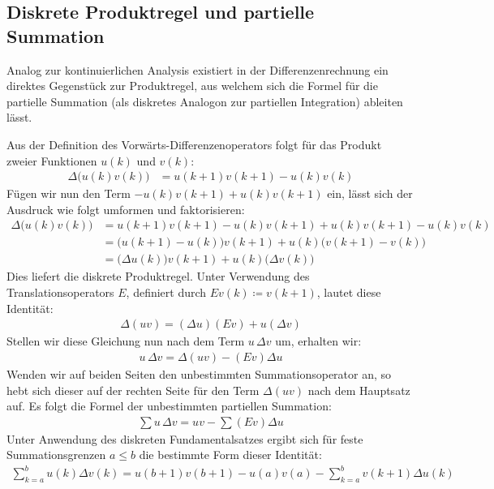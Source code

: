 \documentclass{article}
\theoremstyle{definition}
\begin{document}
\subsection{Diskrete Produktregel und partielle Summation}
Analog zur kontinuierlichen Analysis existiert in der Differenzenrechnung ein direktes Gegenstück zur Produktregel, aus welchem sich die Formel für die partielle Summation (als diskretes Analogon zur partiellen Integration) ableiten lässt.

Aus der Definition des Vorwärts-Differenzenoperators folgt für das Produkt zweier Funktionen $u(k)$ und $v(k)$:
\begin{align*}
    \Delta \big(u(k)v(k)\big) &= u(k + 1)v(k + 1) - u(k)v(k)
\end{align*}
Fügen wir nun den Term $-u(k)v(k + 1) + u(k)v(k + 1)$ ein, lässt sich der Ausdruck wie folgt umformen und faktorisieren:
\begin{align*}
    \Delta \big(u(k)v(k)\big) &= u(k + 1)v(k + 1) - u(k)v(k + 1) + u(k)v(k + 1) - u(k)v(k) \\
    &= \big(u(k + 1) - u(k)\big)v(k + 1) + u(k)\big(v(k + 1) - v(k)\big) \\
    &= \big(\Delta u(k)\big)v(k + 1) + u(k)\big(\Delta v(k)\big)
\end{align*}
Dies liefert die diskrete Produktregel. Unter Verwendung des Translationsoperators $E$, definiert durch $Ev(k) \coloneqq v(k+1)$, lautet diese Identität:
\begin{align*}
    \Delta (uv) = (\Delta u)(Ev) + u(\Delta v)
\end{align*}
Stellen wir diese Gleichung nun nach dem Term $u\,\Delta v$ um, erhalten wir:
\begin{align*}
    u\,\Delta v = \Delta(uv) - (Ev)\Delta u
\end{align*}
Wenden wir auf beiden Seiten den unbestimmten Summationsoperator an, so hebt sich dieser auf der rechten Seite für den Term $\Delta(uv)$ nach dem Hauptsatz auf. Es folgt die Formel der unbestimmten partiellen Summation:
\begin{align*}
    \sum u\,\Delta v = uv - \sum (Ev)\Delta u
\end{align*}
Unter Anwendung des diskreten Fundamentalsatzes ergibt sich für feste Summationsgrenzen $a \le b$ die bestimmte Form dieser Identität:
\begin{align*}
    \sum_{k=a}^{b} u(k)\Delta v(k) = u(b+1)v(b+1) - u(a)v(a) - \sum_{k=a}^{b} v(k+1)\Delta u(k)
\end{align*}
\end{document}
